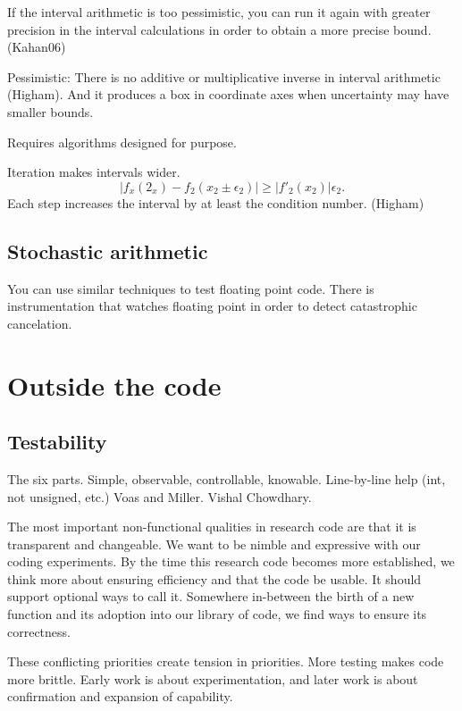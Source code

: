 \documentclass[fleqn,10pt]{olplainarticle}
\begin{document}
If the interval arithmetic is too pessimistic, you can run it again with greater precision in the interval calculations in order to obtain a more precise bound. (Kahan06)

Pessimistic: There is no additive or multiplicative inverse in interval arithmetic (Higham). And it produces a box in coordinate axes when uncertainty may have smaller bounds.

Requires algorithms designed for purpose.

Iteration makes intervals wider.
\begin{equation}
  |f_x(2_x) - f_2(x_2\pm \epsilon_2)| \ge |f'_2(x_2)|\epsilon_2.
\end{equation}
Each step increases the interval by at least the condition number. (Higham)


\subsection{Stochastic arithmetic}

You can use similar techniques to test floating point code. There is instrumentation that watches floating point in order to detect catastrophic cancelation.




\section{Outside the code}\label{sec:outside-code}

\subsection{Testability}

The six parts. Simple, observable, controllable, knowable. Line-by-line help (int, not unsigned, etc.) Voas and Miller. Vishal Chowdhary.

The most important non-functional qualities in research code are that it
is transparent and changeable. We want to be nimble and expressive
with our coding experiments. By the time this research code
becomes more established, we think more about ensuring efficiency
and that the code be usable. It should support optional ways to
call it. Somewhere in-between the birth of a new function and its
adoption into our library of code, we find ways to ensure its
correctness.

These conflicting priorities create tension in priorities.
More testing makes code more brittle. Early work is about
experimentation, and later work is about confirmation and
expansion of capability.
\end{document}
